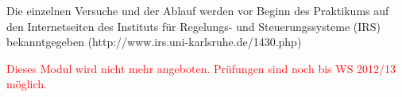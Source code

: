 \begin{module}
\begin{learningoutcomes}
\end{learningoutcomes}

\begin{content}
Die einzelnen Versuche und der Ablauf werden vor Beginn des Praktikums auf den Internetseiten des Instituts für Regelungs- und Steuerungssysteme (IRS) bekanntgegeben (http://www.irs.uni-karlsruhe.de/1430.php)


\end{content}

\begin{remarks}\textcolor{red}{Dieses Modul wird nicht mehr angeboten. Prüfungen sind noch bis WS 2012/13 möglich.}

\end{remarks}

\end{module}

